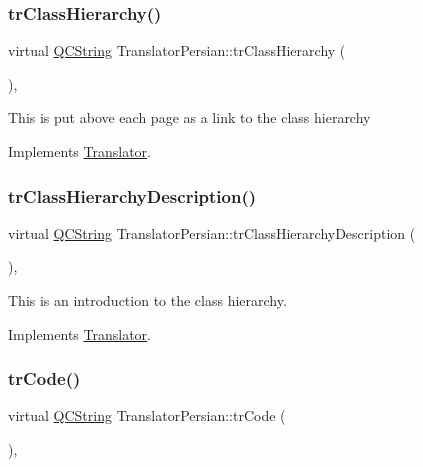 \subsubsection{\texorpdfstring{trClassHierarchy()}{trClassHierarchy()}}
{\footnotesize\ttfamily virtual \mbox{\hyperlink{class_q_c_string}{Q\+C\+String}} Translator\+Persian\+::tr\+Class\+Hierarchy (\begin{DoxyParamCaption}{ }\end{DoxyParamCaption})\hspace{0.3cm}{\ttfamily [inline]}, {\ttfamily [virtual]}}

This is put above each page as a link to the class hierarchy 

Implements \mbox{\hyperlink{class_translator}{Translator}}.

\mbox{\label{class_translator_persian_accf84f86aab540de5033dd5481629e97}} 
\subsubsection{\texorpdfstring{trClassHierarchyDescription()}{trClassHierarchyDescription()}}
{\footnotesize\ttfamily virtual \mbox{\hyperlink{class_q_c_string}{Q\+C\+String}} Translator\+Persian\+::tr\+Class\+Hierarchy\+Description (\begin{DoxyParamCaption}{ }\end{DoxyParamCaption})\hspace{0.3cm}{\ttfamily [inline]}, {\ttfamily [virtual]}}

This is an introduction to the class hierarchy. 

Implements \mbox{\hyperlink{class_translator}{Translator}}.

\mbox{\label{class_translator_persian_a444230aaa4a6c28331f3bf1a1b76b371}} 
\subsubsection{\texorpdfstring{trCode()}{trCode()}}
{\footnotesize\ttfamily virtual \mbox{\hyperlink{class_q_c_string}{Q\+C\+String}} Translator\+Persian\+::tr\+Code (\begin{DoxyParamCaption}{ }\end{DoxyParamCaption})\hspace{0.3cm}{\ttfamily [inline]}, {\ttfamily [virtual]}}


